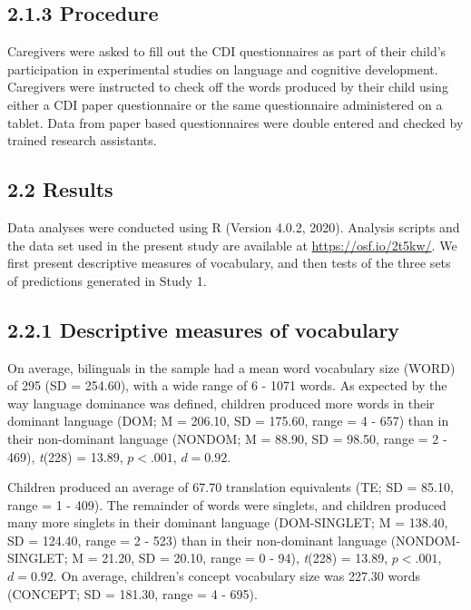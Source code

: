 \documentclass[
  english,
  ,man,floatsintext]{apa6}
\begin{document}
\hypertarget{procedure}{%
\subsection{2.1.3 Procedure}\label{procedure}}

Caregivers were asked to fill out the CDI questionnaires as part of their child's participation in experimental studies on language and cognitive development. Caregivers were instructed to check off the words produced by their child using either a CDI paper questionnaire or the same questionnaire administered on a tablet. Data from paper based questionnaires were double entered and checked by trained research assistants.

\hypertarget{results}{%
\subsection{2.2 Results}\label{results}}

Data analyses were conducted using R (Version 4.0.2, 2020). Analysis scripts and the data set used in the present study are available at \url{https://osf.io/2t5kw/}. We first present descriptive measures of vocabulary, and then tests of the three sets of predictions generated in Study 1.

\hypertarget{descriptive-measures-of-vocabulary}{%
\subsection{2.2.1 Descriptive measures of vocabulary}\label{descriptive-measures-of-vocabulary}}

On average, bilinguals in the sample had a mean word vocabulary size (WORD) of 295 (SD = 254.60), with a wide range of 6 - 1071 words. As expected by the way language dominance was defined, children produced more words in their dominant language (DOM; M = 206.10, SD = 175.60, range = 4 - 657) than in their non-dominant language (NONDOM; M = 88.90, SD = 98.50, range = 2 - 469), \emph{t}(228) = 13.89, \(p < .001\), \(d = 0.92\).

Children produced an average of 67.70 translation equivalents (TE; SD = 85.10, range = 1 - 409). The remainder of words were singlets, and children produced many more singlets in their dominant language (DOM-SINGLET; M = 138.40, SD = 124.40, range = 2 - 523) than in their non-dominant language (NONDOM-SINGLET; M = 21.20, SD = 20.10, range = 0 - 94), \emph{t}(228) = 13.89, \(p < .001\), \(d = 0.92\). On average, children's concept vocabulary size was 227.30 words (CONCEPT; SD = 181.30, range = 4 - 695).
\end{document}
